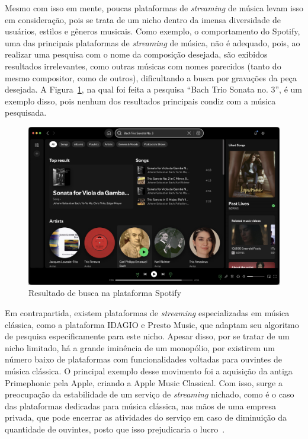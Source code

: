 \documentclass[12pt]{article}
\begin{document}
Mesmo com isso em mente, poucas plataformas de \emph{streaming} de música levam
isso em consideração, pois se trata de um nicho dentro da imensa diversidade de
usuários, estilos e gêneros musicais.
Como exemplo, o comportamento do Spotify, uma das principais plataformas de
\emph{streaming} de música, não é adequado, pois, ao realizar uma pesquisa com o
nome da composição desejada, são exibidos resultados irrelevantes, como outras
músicas com nomes parecidos (tanto do mesmo compositor, como de outros), 
dificultando a busca por gravações da peça desejada.
A Figura~\ref{fig:spotify}, na qual foi feita a pesquisa ``Bach Trio Sonata no. 3'',
é um exemplo disso, pois nenhum dos resultados principais condiz com a música
pesquisada.

\begin{figure}[ht]
\centering
\includegraphics[width=1\textwidth]{figuras/Spotify.png}
\caption{Resultado de busca na plataforma Spotify}
\label{fig:spotify}
\end{figure}

Em contrapartida, existem plataformas de \emph{streaming} especializadas em
música clássica, como a plataforma IDAGIO e Presto Music, que adaptam seu
algoritmo de pesquisa especificamente para este nicho. Apesar disso, por se
tratar de um nicho limitado, há a grande iminência de um monopólio, por
existirem um número baixo de plataformas com funcionalidades voltadas para
ouvintes de música clássica. O principal exemplo desse movimento foi a aquisição
da antiga Primephonic pela Apple, criando a Apple Music Classical.
Com isso, surge a preocupação da estabilidade de um serviço de \emph{streaming}
nichado, como é o caso das plataformas dedicadas para música clássica, nas mãos
de uma empresa privada, que pode encerrar as atividades do serviço em caso de
diminuição da quantidade de ouvintes, posto que isso prejudicaria o lucro~\cite{Bl:25}.
\end{document}
